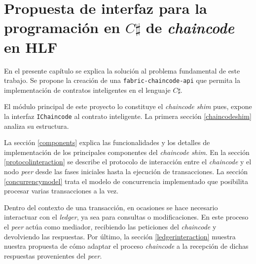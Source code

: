 \chapter{Propuesta de interfaz para la programación en $ C\sharp $ de \textit{chaincode} en HLF}\label{chapter:proposal}
En el presente capítulo se explica la solución al problema fundamental de este trabajo. Se propone la creación de una \texttt{fabric-chaincode-api} que permita la implementación de contratos inteligentes en el lenguaje $ C\sharp $.

El módulo principal de este proyecto lo constituye el \textit{chaincode shim }pues, expone la interfaz \texttt{IChaincode} al contrato inteligente. La primera sección \ref{chaincodeshim} analiza su estructura.

La sección \ref{components} explica las funcionalidades y los detalles de implementación de los principales componentes del \textit{chaincode shim}. En la sección \ref{protocolinteraction} se describe el protocolo de interacción entre el \textit{chaincode} y el nodo \textit{peer} desde las fases iniciales hasta la ejecución de transacciones. La sección \ref{concurrencymodel} trata el modelo de concurrencia implementado que posibilita procesar varias transacciones a la vez.

Dentro del contexto de una transacción, en ocasiones se hace necesario interactuar con el \textit{ledger}, ya sea para consultas o modificaciones. En este proceso el \textit{peer} actúa como mediador, recibiendo las peticiones del \textit{chaincode} y devolviendo las respuestas. Por último, la sección \ref{ledgerinteraction} muestra nuestra propuesta de cómo adaptar el proceso \textit{chaincode} a la recepción de dichas respuestas provenientes del \textit{peer}.



